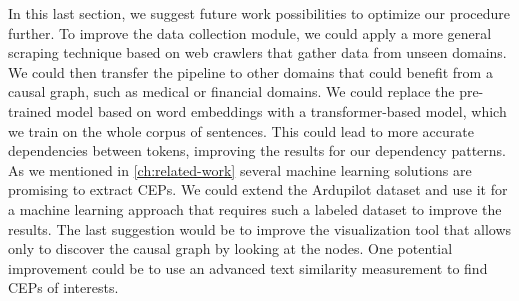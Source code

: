 In this last section, we suggest future work possibilities to optimize our procedure further.
To improve the data collection module, we could apply a more general scraping technique based on web crawlers that gather data from unseen domains.
We could then transfer the pipeline to other domains that could benefit from a causal graph, such as medical or financial domains.
We could replace the pre-trained model based on word embeddings with a transformer-based model, which we train on the whole corpus of sentences.
This could lead to more accurate dependencies between tokens, improving the results for our dependency patterns.
As we mentioned in \autoref{ch:related-work} several machine learning solutions are promising to extract \ac{CEP}s.
We could extend the Ardupilot dataset and use it for a machine learning approach that requires such a labeled dataset to improve the results.
The last suggestion would be to improve the visualization tool that allows only to discover the causal graph by looking at the nodes.
One potential improvement could be to use an advanced text similarity measurement to find \ac{CEP}s of interests.

